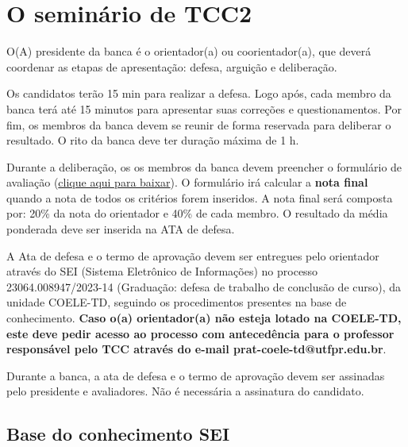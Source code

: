\documentclass[a4paper, 12pt]{article}
\newcommand{\seiprocess}{23064.008947/2023-14}
\begin{document}
	\section{O seminário de TCC2}
	
	O(A) presidente da banca é o orientador(a) ou coorientador(a), que deverá coordenar as etapas de apresentação: defesa, arguição e deliberação. 
	
	Os candidatos terão 15 min para realizar a defesa. Logo após, cada membro da banca terá até 15 minutos para apresentar suas correções e questionamentos. Por fim, os membros da banca devem se reunir de forma reservada para deliberar o resultado. O rito da banca deve ter duração máxima de 1 h.
	
	Durante a deliberação, os os membros da banca devem preencher o formulário de avaliação (\href{https://nuvem.utfpr.edu.br/index.php/s/gK76empfxjAIMbl}{clique aqui para baixar}). O formulário irá calcular a \textbf{nota final} quando a nota de todos os critérios forem inseridos. A nota final será composta por: 20\% da nota do orientador e 40\% de cada membro. O resultado da média ponderada deve ser inserida na ATA de defesa. 
	
	
	
	A Ata de defesa e o termo de aprovação devem ser entregues pelo orientador através do SEI (Sistema Eletrônico de Informações) no processo \seiprocess{} (Graduação: defesa de trabalho de conclusão de curso), da unidade COELE-TD, seguindo os procedimentos presentes na base de conhecimento. \textbf{Caso o(a) orientador(a) não esteja lotado na COELE-TD, este deve pedir acesso ao processo com antecedência para o professor responsável pelo TCC através do e-mail prat-coele-td@utfpr.edu.br}.

	Durante a banca, a ata de defesa e o termo de aprovação devem ser assinadas pelo presidente e avaliadores. Não é necessária a assinatura do candidato. 
	
	\subsection{Base do conhecimento SEI}
	
\end{document}
